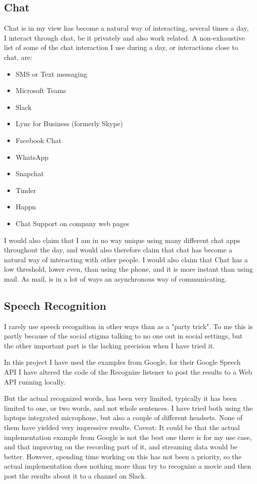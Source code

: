 \documentclass[11pt,fleqn]{book} %
\begin{document}
\subsection{Chat}
Chat is in my view has become a natural way of interacting, several times a day, I interact through chat, be it privately and also work related. A non-exhaustive list of some of the chat interaction I use during a day, or interactions close to chat, are:
\begin{itemize}
\item SMS or Text messaging
\item Microsoft Teams
\item Slack
\item Lync for Business (formerly Skype)
\item Facebook Chat
\item WhatsApp
\item Snapchat 
\item Tinder
\item Happn
\item Chat Support on company web pages
\end{itemize}

I would also claim that I am in no way unique using many different chat apps throughout the day, and would also therefore claim that chat has become a natural way of interacting with other people.
I would also claim that Chat has a low threshold, lower even, than using the phone, and it is more instant than using mail. As mail, is in a lot of ways an asynchronous way of communicating.

\subsection{Speech Recognition}
I rarely use speech recognition in other ways than as a "party trick". To me this is partly because of the social stigma talking to no one out in social settings, but the other important part is the lacking precision when I have tried it.

In this project I have used the examples from Google, for their Google Speech API
\cite{GoogleCloudPlatformSpeechPlatform}
I have altered the code of the Recognize listener to post the results to a Web API running locally.

But the actual recognized words, has been very limited, typically it has been limited to one, or two words, and not whole sentences.
I have tried both using the laptops integrated microphone, but also a couple of different headsets. None of them have yielded very impressive results.
Caveat: It could be that the actual implementation example from Google is not the best one there is for my use case, and that improving on the recording part of it, and streaming data would be better. However, spending time working on this has not been a priority, so the actual implementation does nothing more than try to recognize a movie and then post the results about it to a channel on Slack.
\end{document}

